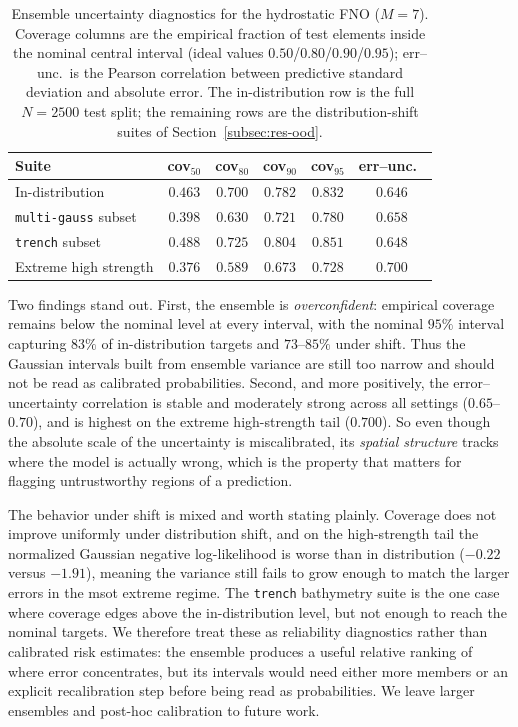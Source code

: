 \begin{table}[H]
\centering
\caption{Ensemble uncertainty diagnostics for the hydrostatic FNO ($M = 7$). Coverage columns are the empirical fraction of test elements inside the nominal central interval (ideal values $0.50$/$0.80$/$0.90$/$0.95$); err--unc.\ is the Pearson correlation between predictive standard deviation and absolute error. The in-distribution row is the full $N = 2500$ test split; the remaining rows are the distribution-shift suites of Section~\ref{subsec:res-ood}.}
\label{tab:uncertainty}
\begin{tabular}{lccccc}
    \toprule
    Suite & cov$_{50}$ & cov$_{80}$ & cov$_{90}$ & cov$_{95}$ & err--unc.\ \\
    \midrule
    In-distribution             & $0.463$ & $0.700$ & $0.782$ & $0.832$ & $0.646$ \\
    \texttt{multi-gauss} subset & $0.398$ & $0.630$ & $0.721$ & $0.780$ & $0.658$ \\
    \texttt{trench} subset      & $0.488$ & $0.725$ & $0.804$ & $0.851$ & $0.648$ \\
    Extreme high strength       & $0.376$ & $0.589$ & $0.673$ & $0.728$ & $0.700$ \\
    \bottomrule
\end{tabular}
\end{table}

Two findings stand out. First, the ensemble is \emph{overconfident}: empirical coverage remains below the nominal level at every interval, with the nominal $95\%$ interval capturing $83\%$ of in-distribution targets and $73$--$85\%$ under shift. Thus the Gaussian intervals built from ensemble variance are still too narrow and should not be read as calibrated probabilities. Second, and more positively, the error--uncertainty correlation is stable and moderately strong across all settings ($0.65$--$0.70$), and is highest on the extreme high-strength tail ($0.700$). So even though the absolute scale of the uncertainty is miscalibrated, its \emph{spatial structure} tracks where the model is actually wrong, which is the property that matters for flagging untrustworthy regions of a prediction.

The behavior under shift is mixed and worth stating plainly. Coverage does not improve uniformly under distribution shift, and on the high-strength tail the normalized Gaussian negative log-likelihood is worse than in distribution ($-0.22$ versus $-1.91$), meaning the variance still fails to grow enough to match the larger errors in the msot extreme regime. The \texttt{trench} bathymetry suite is the one case where coverage edges above the in-distribution level, but not enough to reach the nominal targets. We therefore treat these as reliability diagnostics rather than calibrated risk estimates: the ensemble produces a useful relative ranking of where error concentrates, but its intervals would need either more members or an explicit recalibration step before being read as probabilities. We leave larger ensembles and post-hoc calibration to future work.

